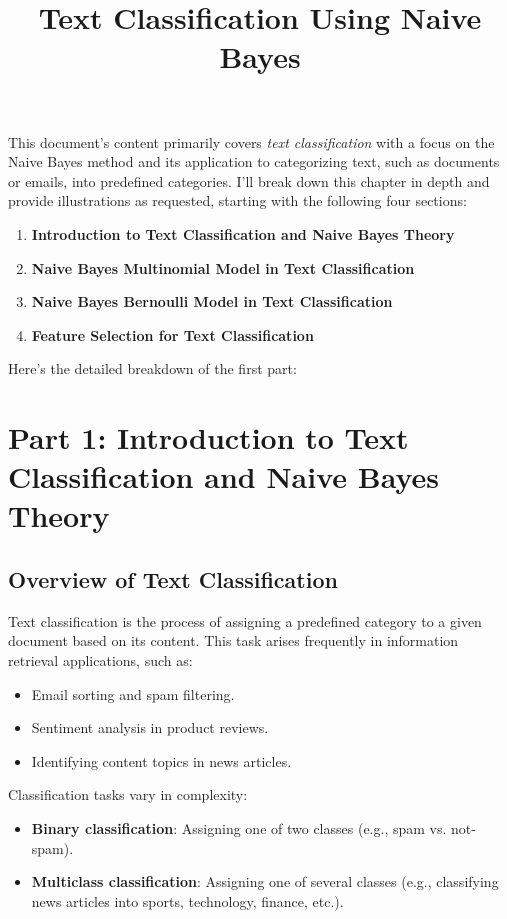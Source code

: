 \documentclass{article}
\title{Text Classification Using Naive Bayes}
\author{}
\date{}
\begin{document}
\maketitle

This document's content primarily covers \textit{text classification} with a focus on the Naive Bayes method and its application to categorizing text, such as documents or emails, into predefined categories. I’ll break down this chapter in depth and provide illustrations as requested, starting with the following four sections:

\begin{enumerate}
    \item \textbf{Introduction to Text Classification and Naive Bayes Theory}
    \item \textbf{Naive Bayes Multinomial Model in Text Classification}
    \item \textbf{Naive Bayes Bernoulli Model in Text Classification}
    \item \textbf{Feature Selection for Text Classification}
\end{enumerate}

Here’s the detailed breakdown of the first part:

\section*{Part 1: Introduction to Text Classification and Naive Bayes Theory}

\subsection*{Overview of Text Classification}
Text classification is the process of assigning a predefined category to a given document based on its content. This task arises frequently in information retrieval applications, such as:
\begin{itemize}
    \item Email sorting and spam filtering.
    \item Sentiment analysis in product reviews.
    \item Identifying content topics in news articles.
\end{itemize}

Classification tasks vary in complexity:
\begin{itemize}
    \item \textbf{Binary classification}: Assigning one of two classes (e.g., spam vs. not-spam).
    \item \textbf{Multiclass classification}: Assigning one of several classes (e.g., classifying news articles into sports, technology, finance, etc.).
\end{itemize}
\end{document}
